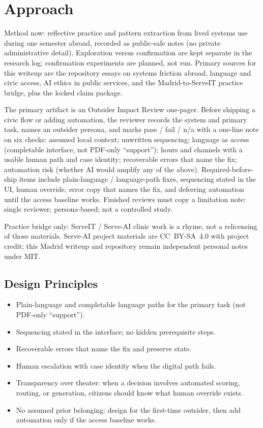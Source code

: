 \documentclass[10pt,twocolumn]{article}
\begin{document}
\section{Approach}
Method now: reflective practice and pattern extraction from lived systems use
during one semester abroad, recorded as public-safe notes (no private
administrative detail). Exploration versus confirmation are kept separate in the
research log; confirmation experiments are planned, not run. Primary sources for
this writeup are the repository essays on systems friction abroad, language and
civic access, AI ethics in public services, and the Madrid-to-ServeIT practice
bridge, plus the locked claim package.

The primary artifact is an Outsider Impact Review one-pager. Before shipping a
civic flow or adding automation, the reviewer records the system and primary
task, names an outsider persona, and marks pass / fail / n/a with a one-line note
on six checks: assumed local context; unwritten sequencing; language as access
(completable interface, not PDF-only ``support''); hours and channels with a
usable human path and case identity; recoverable errors that name the fix;
automation risk (whether AI would amplify any of the above). Required-before-ship
items include plain-language / language-path fixes, sequencing stated in the UI,
human override, error copy that names the fix, and deferring automation until the
access baseline works. Finished reviews must copy a limitation note: single
reviewer; persona-based; not a controlled study.

Practice bridge only: ServeIT / Serve-AI clinic work is a rhyme, not a
relicensing of those materials. Serve-AI project materials are CC~BY-SA~4.0 with
project credit; this Madrid writeup and repository remain independent personal
notes under MIT.

\subsection{Design Principles}
\begin{itemize}
  \item Plain-language and completable language paths for the primary task
        (not PDF-only ``support'').
  \item Sequencing stated in the interface; no hidden prerequisite steps.
  \item Recoverable errors that name the fix and preserve state.
  \item Human escalation with case identity when the digital path fails.
  \item Transparency over theater: when a decision involves automated scoring,
        routing, or generation, citizens should know what human override exists.
  \item No assumed prior belonging: design for the first-time outsider, then
        add automation only if the access baseline works.
\end{itemize}
\end{document}

